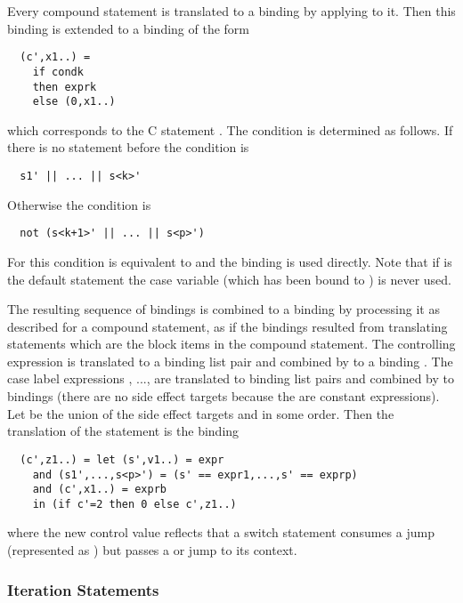 Every compound statement  is translated to a binding  by applying  to it. 
Then this binding is extended to a binding  of the form
\begin{verbatim}
  (c',x1..) = 
    if condk
    then exprk
    else (0,x1..)
\end{verbatim}
which corresponds to the C statement . The condition  is determined as follows.
If there is no  statement before  the condition is
\begin{verbatim}
  s1' || ... || s<k>'
\end{verbatim}
Otherwise the condition is
\begin{verbatim}
  not (s<k+1>' || ... || s<p>')
\end{verbatim}
For  this condition is equivalent to  and the binding  is used directly. Note that if
 is the default statement the case variable  (which has been bound to ) is never used.

The resulting sequence of bindings  is combined to a binding  by processing it as described 
for a compound statement, as if the bindings resulted from translating statements which are the block items in the compound 
statement. The controlling expression  is translated to a binding list pair and combined by  to a binding 
. The case label expressions , ...,  are translated to binding list pairs and combined by 
 to bindings  (there are no side effect targets because the  are constant expressions). 
Let  be the union of the side effect 
targets  and  in some order. Then the translation of the  statement is the binding
\begin{verbatim}
  (c',z1..) = let (s',v1..) = expr
    and (s1',...,s<p>') = (s' == expr1,...,s' == exprp)
    and (c',x1..) = exprb
    in (if c'=2 then 0 else c',z1..)
\end{verbatim}
where the new control value reflects that a switch statement consumes a  jump (represented as ) but passes a
 or  jump to its context.

\subsubsection{Iteration Statements}

